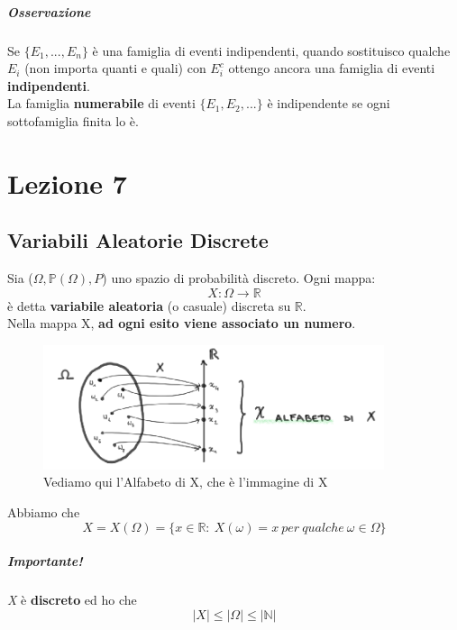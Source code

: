 \documentclass{report}
\newcommand{\Pn}{\mathbb{P}}
\begin{document}
\paragraph{Osservazione} Se \(\{E_1,...,E_n\}\) è una famiglia di eventi indipendenti, quando sostituisco qualche \(E_i\) (non importa quanti e quali) con \(E_i^c\) ottengo ancora una famiglia di eventi \textbf{indipendenti}.\\
La famiglia \textbf{numerabile} di eventi \(\{E_1,E_2,...\}\) è indipendente se ogni sottofamiglia finita lo è.

\chapter{Lezione 7}
\section{Variabili Aleatorie Discrete}
Sia (\(\Omega, \Pn(\Omega), P\)) uno spazio di probabilità discreto. Ogni mappa: \[X: \Omega \xrightarrow{} \mathbb{R}\] è detta \textbf{variabile aleatoria} (o casuale) discreta su \(\mathbb{R}\).\\
Nella mappa X, \textbf{ad ogni esito viene associato un numero}.
\begin{figure}[hb]
    \centering
    \includegraphics[width = 10cm]{AlfabetoX.png}
    \caption{Vediamo qui l'Alfabeto di X, che è l'immagine di X}
    \label{fig:AlfabetoX}
\end{figure}
Abbiamo che \[\textit{X} = X(\Omega) = \{x \in \mathbb{R}:\ X(\omega) = x\ per\ qualche\ \omega \in \Omega\}\]
\paragraph{Importante!} \textit{X} è \textbf{discreto} ed ho che \[|\textit{X}| \leq |\Omega| \leq |\mathbb{N}|\]
\end{document}
